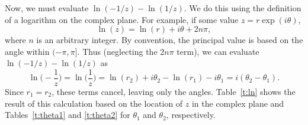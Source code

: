 Now, we must evaluate $\ln(-1/z)-\ln(1/z)$. 
We do this using the definition of a logarithm on the complex plane.
For example, if some value $z = r \exp(i \theta)$,
\begin{equation}
	\ln(z) = \ln(r) + i \theta + 2 n \pi,
\end{equation}
where $n$ is an arbitrary integer. 
By convention, the principal value is based on the angle within $(-\pi,\pi]$.
Thus (neglecting the $2n\pi$ term), we can evaluate $\ln(-1/z)-\ln(1/z)$ as
\begin{equation}
	\ln\Big(-\frac{1}{z} \Big) = \ln \Big(\frac{1}{z}\Big) 
	= \ln (r_2) + i \theta_2 - \ln(r_1) - i \theta_1
	= i(\theta_2 - \theta_1).
\end{equation}
Since $r_1=r_2$, these terms cancel, leaving only the angles.
Table~\ref{t:ln} shows the result of this calculation based
on the location of $z$ in the complex plane and Tables~\ref{t:theta1}
and \ref{t:theta2} for $\theta_1$ and $\theta_2$, respectively.
